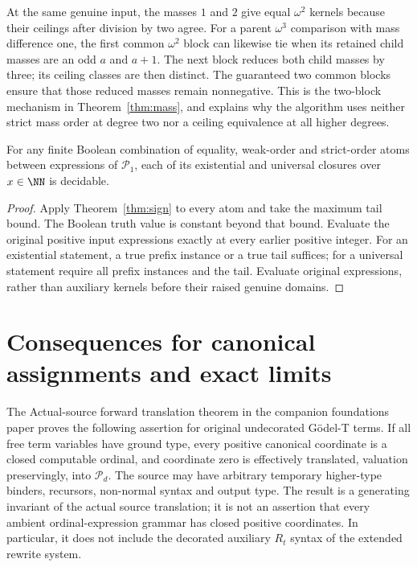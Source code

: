 \documentclass[11pt,a4paper]{article}
\begin{document}
\begin{example}
At the same genuine input, the masses $1$ and $2$ give equal
$\omega^2$ kernels because their ceilings after division by two agree.
For a parent $\omega^3$ comparison with mass difference one, the first
common $\omega^2$ block can likewise tie when its retained child masses
are an odd $a$ and $a+1$. The next block reduces both child masses by
three; its ceiling classes are then distinct. The guaranteed two common
blocks ensure that those reduced masses remain nonnegative.
This is the two-block mechanism in
Theorem~\ref{thm:mass}, and explains why the algorithm uses neither strict
mass order at degree two nor a ceiling equivalence at all higher degrees.
\end{example}

\begin{corollary}\label{cor:boolean}
For any finite Boolean combination of equality, weak-order and strict-order
atoms between expressions of $\mathcal P_1$, each of its existential and
universal closures over $x\in\NN$ is decidable.
\end{corollary}
\begin{proof}
Apply Theorem~\ref{thm:sign} to every atom and take the maximum tail bound.
The Boolean truth value is constant beyond that bound. Evaluate the
original positive input expressions exactly at every earlier positive
integer. For an existential statement, a true prefix instance or a true
tail suffices; for a universal statement require all prefix instances and
the tail. Evaluate original expressions, rather than auxiliary kernels
before their raised genuine domains.
\end{proof}

\section{Consequences for canonical assignments and exact limits}
The Actual-source forward translation theorem in the companion foundations
paper \cite{wwfoundations} proves the following assertion for original
undecorated G\"odel-T terms. If all free
term variables have ground type, every positive canonical coordinate is
a closed computable ordinal, and coordinate zero is effectively translated,
valuation preservingly, into $\mathcal P_d$. The source may have arbitrary
temporary higher-type binders, recursors, non-normal syntax and output
type. The result is a generating invariant of the actual source translation;
it is not an assertion that every ambient ordinal-expression grammar has
closed positive coordinates. In particular, it does not include the
decorated auxiliary $R_t$ syntax of the extended rewrite system.
\end{document}
